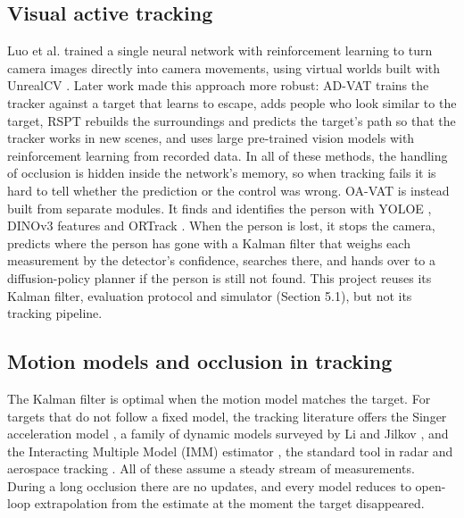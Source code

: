 \documentclass[12pt,a4paper]{article}
\begin{document}
\subsection{Visual active tracking}
Luo et al. \cite{r1,r2} trained a single neural network with reinforcement learning to turn camera images directly into camera movements, using virtual worlds built with UnrealCV \cite{r5}.
Later work made this approach more robust: AD-VAT \cite{r6} trains the tracker against a target that learns to escape, \cite{r7} adds people who look similar to the target, RSPT \cite{r8} rebuilds the surroundings and predicts the target's path so that the tracker works in new scenes, and \cite{r9} uses large pre-trained vision models with reinforcement learning from recorded data.
In all of these methods, the handling of occlusion is hidden inside the network's memory, so when tracking fails it is hard to tell whether the prediction or the control was wrong.
OA-VAT \cite{r3} is instead built from separate modules.
It finds and identifies the person with YOLOE \cite{r10}, DINOv3 features \cite{r11} and ORTrack \cite{r12}.
When the person is lost, it stops the camera, predicts where the person has gone with a Kalman filter that weighs each measurement by the detector's confidence, searches there, and hands over to a diffusion-policy planner \cite{r13} if the person is still not found.
This project reuses its Kalman filter, evaluation protocol and simulator (Section 5.1), but not its tracking pipeline.

\subsection{Motion models and occlusion in tracking}
The Kalman filter \cite{r14} is optimal when the motion model matches the target. For targets that do not follow a fixed model, the tracking literature offers the Singer acceleration model \cite{r15}, a family of dynamic models surveyed by Li and Jilkov \cite{r16}, and the Interacting Multiple Model (IMM) estimator \cite{r17}, the standard tool in radar and aerospace tracking \cite{r18}. All of these assume a steady stream of measurements. During a long occlusion there are no updates, and every model reduces to open-loop extrapolation from the estimate at the moment the target disappeared.
\end{document}
